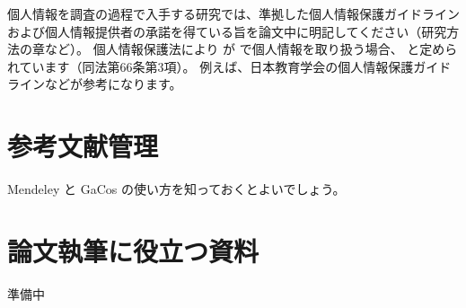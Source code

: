 		個人情報を調査の過程で入手する研究では、準拠した個人情報保護ガイドラインおよび個人情報提供者の承諾を得ている旨を論文中に明記してください（研究方法の章など）。
		個人情報保護法により  が  で個人情報を取り扱う場合、 と定められています（同法第66条第3項）。
		例えば、日本教育学会の個人情報保護ガイドラインなどが参考になります。


\chapter{参考文献管理}
	\label{app:bibliography}

	Mendeley と GaCos の使い方を知っておくとよいでしょう。

\chapter{論文執筆に役立つ資料}
	\label{app:useful}

	準備中
